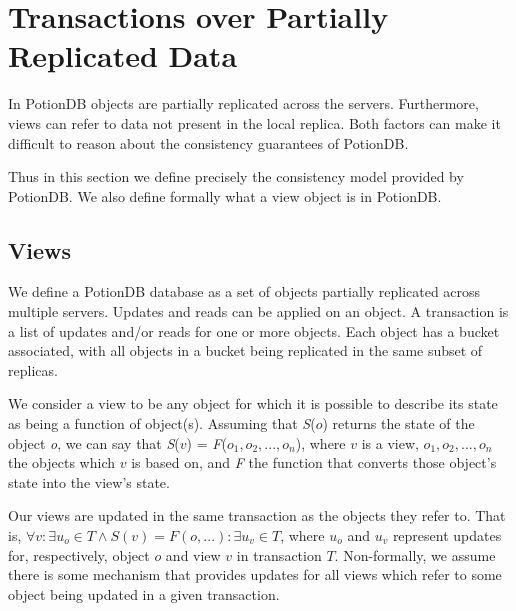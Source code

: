 \documentclass{vldb}
\newcommand{\emphfunction}[2]{\emph{#1}($#2$)}
\begin{document}


\section{Transactions over Partially Replicated Data}

In PotionDB objects are partially replicated across the servers.
Furthermore, views can refer to data not present in the local replica.
Both factors can make it difficult to reason about the consistency guarantees of PotionDB.

Thus in this section we define precisely the consistency model provided by PotionDB.
We also define formally what a view object is in PotionDB.


\subsection{Views}

We define a PotionDB database as a set of objects partially replicated across multiple servers.
Updates and reads can be applied on an object.
A transaction is a list of updates and/or reads for one or more objects.
Each object has a bucket associated, with all objects in a bucket being replicated in the same subset of replicas. %

We consider a view to be any object for which it is possible to describe its state as being a function of object(s).
Assuming that \emphfunction{S}{o} returns the state of the object \emph{o}, we can say that \emphfunction{S}{v} = \emphfunction{F}{o_1, o_2, ..., o_n}, where $v$ is a view, $o_1, o_2, ..., o_n$ the objects which $v$ is based on, and \emph{F} the function that converts those object's state into the view's state.

Our views are updated in the same transaction as the objects they refer to.
That is, $\forall v: \exists u_o \in T \land S(v)=F(o, ...) : \exists u_v \in T$, where $u_o$ and $u_v$ represent updates for, respectively, object $o$ and view $v$ in transaction $T$.
Non-formally, we assume there is some mechanism that provides updates for all views which refer to some object being updated in a given transaction. %
\end{document}
